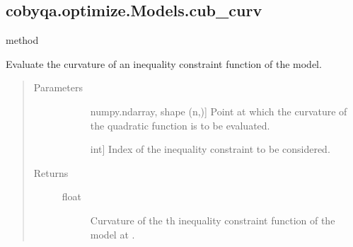 \documentclass[letterpaper,10pt,english]{sphinxmanual}
\begin{document}
\begin{fulllineitems}
\begin{fulllineitems}
\end{fulllineitems}



\subsection{cobyqa.optimize.Models.cub\_curv}
\label{\detokenize{refs/generated/cobyqa.optimize.Models.cub_curv:cobyqa-optimize-models-cub-curv}}\label{\detokenize{refs/generated/cobyqa.optimize.Models.cub_curv::doc}}
\sphinxAtStartPar
method

\begin{fulllineitems}
\label{\detokenize{refs/generated/cobyqa.optimize.Models.cub_curv:cobyqa.optimize.Models.cub_curv}}
\sphinxAtStartPar
Evaluate the curvature of an inequality constraint function of the
model.
\begin{quote}\begin{description}
\item[{Parameters}] \leavevmode\begin{description}
\item[{}] \leavevmode{[}numpy.ndarray, shape (n,){]}
\sphinxAtStartPar
Point at which the curvature of the quadratic function is to be
evaluated.

\item[{}] \leavevmode{[}int{]}
\sphinxAtStartPar
Index of the inequality constraint to be considered.

\end{description}

\item[{Returns}] \leavevmode\begin{description}
\item[{float}] \leavevmode
\sphinxAtStartPar
Curvature of the \sphinxhyphen{}th inequality constraint function of the model
at .

\end{description}

\end{description}\end{quote}

\end{fulllineitems}




\end{fulllineitems}
\end{document}
